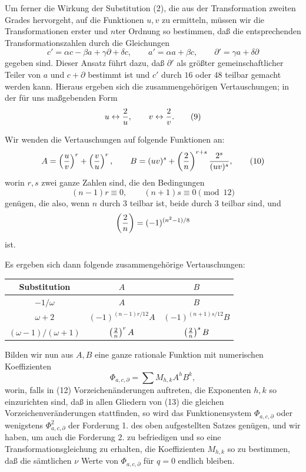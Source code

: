 \documentclass[11pt]{article}
\begin{document}
Um ferner die Wirkung der Substitution (2), die aus der Transformation zweiten Grades hervorgeht, auf die Funktionen $u,v$ zu ermitteln, müssen wir die Transformationen erster und $n$ter Ordnung so bestimmen, daß die entsprechenden Transformationszahlen durch die Gleichungen
\begin{equation}
 c'=\alpha c-\beta a+\gamma\partial+\delta c,
 \qquad
 a'=\alpha a+\beta c,
 \qquad
 \partial'=\gamma a+\delta\partial
\tag{6}
\end{equation}
gegeben sind. Dieser Ansatz führt dazu, daß $\partial'$ als größter gemeinschaftlicher Teiler von $a$ und $c+\partial$ bestimmt ist und $c'$ durch $16$ oder $48$ teilbar gemacht werden kann. Hieraus ergeben sich die zusammengehörigen Vertauschungen; in der für uns maßgebenden Form
\begin{equation}
 u\leftrightarrow {2\over u},
 \qquad
 v\leftrightarrow {2\over v}.
\tag{9}
\end{equation}

Wir wenden die Vertauschungen auf folgende Funktionen an:
\begin{equation}
 A=\left({u\over v}\right)^r+\left({v\over u}\right)^r,
 \qquad
 B=(uv)^s+\left({2\over n}\right)^{r+s}{2^s\over(uv)^s},
\tag{10}
\end{equation}
worin $r,s$ zwei ganze Zahlen sind, die den Bedingungen
\begin{equation}
 (n-1)r\equiv0,
 \qquad
 (n+1)s\equiv0\pmod{12}
\tag{11}
\end{equation}
genügen, die also, wenn $n$ durch $3$ teilbar ist, beide durch $3$ teilbar sind, und
\[
 \left({2\over n}\right)=(-1)^{(n^2-1)/8}
\]
ist.

Es ergeben sich dann folgende zusammengehörige Vertauschungen:
\begin{center}
\begin{tabular}{c|cc}
Substitution & $A$ & $B$\\
\hline
$-1/\omega$ & $A$ & $B$\\
$\omega+2$ & $(-1)^{(n-1)r/12}A$ & $(-1)^{(n+1)s/12}B$\\
$(\omega-1)/(\omega+1)$ & $\left({2\over n}\right)^rA$ & $\left({2\over n}\right)^sB$
\end{tabular}
\end{center}
Bilden wir nun aus $A,B$ eine ganze rationale Funktion mit numerischen Koeffizienten
\begin{equation}
 \Phi_{a,c,\partial}=\sum M_{h,k}A^hB^k,
\tag{13}
\end{equation}
worin, falls in (12) Vorzeichenänderungen auftreten, die Exponenten $h,k$ so einzurichten sind, daß in allen Gliedern von (13) die gleichen Vorzeichenveränderungen stattfinden, so wird das Funktionensystem $\Phi_{a,c,\partial}$ oder wenigstens $\Phi_{a,c,\partial}^2$ der Forderung 1. des oben aufgestellten Satzes genügen, und wir haben, um auch die Forderung 2. zu befriedigen und so eine Transformationsgleichung zu erhalten, die Koeffizienten $M_{h,k}$ so zu bestimmen, daß die sämtlichen $\nu$ Werte von $\Phi_{a,c,\partial}$ für $q=0$ endlich bleiben.
\end{document}
